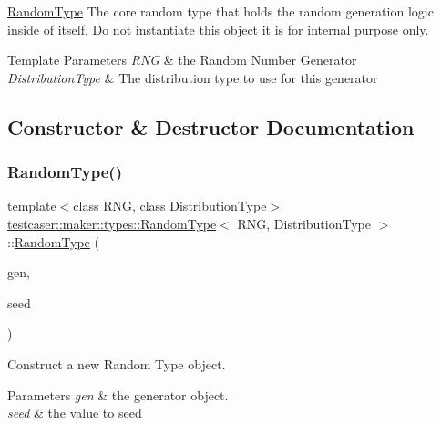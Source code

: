 \mbox{\hyperlink{classtestcaser_1_1maker_1_1types_1_1RandomType}{Random\+Type}} The core random type that holds the random generation logic inside of itself. Do not instantiate this object it is for internal purpose only. 


\begin{DoxyTemplParams}{Template Parameters}
{\em R\+NG} & the Random Number Generator \\
\hline
{\em Distribution\+Type} & The distribution type to use for this generator \\
\hline
\end{DoxyTemplParams}


\subsection{Constructor \& Destructor Documentation}
\mbox{\label{classtestcaser_1_1maker_1_1types_1_1RandomType_afbdc3b4fc75d54b90855ae3f5c9b2aff}} 
\subsubsection{\texorpdfstring{RandomType()}{RandomType()}}
{\footnotesize\ttfamily template$<$class R\+NG, class Distribution\+Type$>$ \\
\mbox{\hyperlink{classtestcaser_1_1maker_1_1types_1_1RandomType}{testcaser\+::maker\+::types\+::\+Random\+Type}}$<$ R\+NG, Distribution\+Type $>$\+::\mbox{\hyperlink{classtestcaser_1_1maker_1_1types_1_1RandomType}{Random\+Type}} (\begin{DoxyParamCaption}\item[{R\+NG \&}]{gen,  }\item[{typename R\+N\+G\+::result\+\_\+type}]{seed }\end{DoxyParamCaption})\hspace{0.3cm}{\ttfamily [inline]}}



Construct a new Random Type object. 


\begin{DoxyParams}{Parameters}
{\em gen} & the generator object. \\
\hline
{\em seed} & the value to seed \\
\hline
\end{DoxyParams}


